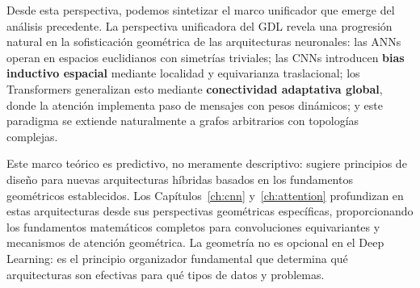 Desde esta perspectiva, podemos sintetizar el marco unificador que emerge del análisis precedente. La perspectiva unificadora del \gls{GDL} revela una progresión natural en la sofisticación geométrica de las arquitecturas neuronales: las \glspl{ANN} operan en espacios euclidianos con simetrías triviales; las \glspl{CNN} introducen \textbf{bias inductivo espacial} mediante localidad y equivarianza traslacional; los \glspl{Transformer} generalizan esto mediante \textbf{conectividad adaptativa global}, donde la atención implementa paso de mensajes con pesos dinámicos; y este paradigma se extiende naturalmente a grafos arbitrarios con topologías complejas.

Este marco teórico es predictivo, no meramente descriptivo: sugiere principios de diseño para nuevas arquitecturas híbridas basados en los fundamentos geométricos establecidos. Los Capítulos~\ref{ch:cnn} y~\ref{ch:attention} profundizan en estas arquitecturas desde sus perspectivas geométricas específicas, proporcionando los fundamentos matemáticos completos para convoluciones equivariantes y mecanismos de atención geométrica. La geometría no es opcional en el Deep Learning: es el principio organizador fundamental que determina qué arquitecturas son efectivas para qué tipos de datos y problemas.

